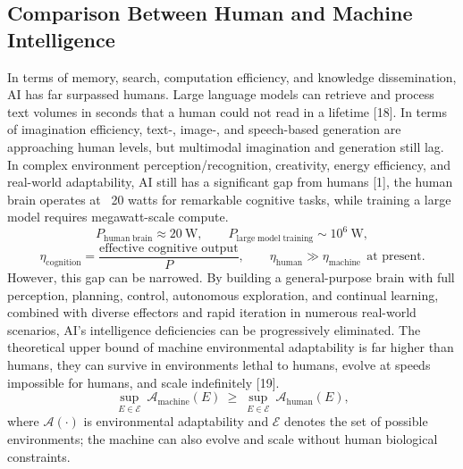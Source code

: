 \documentclass[12pt,a4paper]{article}
\begin{document}
\subsection{Comparison Between Human and Machine Intelligence}
In terms of memory, search, computation efficiency, and knowledge dissemination, AI has far surpassed humans. Large language models can retrieve and process text volumes in seconds that a human could not read in a lifetime [18].
In terms of imagination efficiency, text-, image-, and speech-based generation are approaching human levels, but multimodal imagination and generation still lag.
In complex environment perception/recognition, creativity, energy efficiency, and real-world adaptability, AI still has a significant gap from humans [1], the human brain operates at ~20 watts for remarkable cognitive tasks, while training a large model requires megawatt-scale compute.
\begin{equation}
P_{\mathrm{human\;brain}}\approx20\ \mathrm{W},\qquad
P_{\mathrm{large\;model\;training}}\sim10^{6}\ \mathrm{W},
\label{eq:energy-comparison}
\end{equation}
\begin{equation}
\eta_{\mathrm{cognition}}=\frac{\text{effective cognitive output}}{P},
\qquad
\eta_{\mathrm{human}}\gg\eta_{\mathrm{machine}}\ \ \text{at present}.
\label{eq:cognitive-efficiency}
\end{equation}
However, this gap can be narrowed. By building a general-purpose brain with full perception, planning, control, autonomous exploration, and continual learning, combined with diverse effectors and rapid iteration in numerous real-world scenarios, AI's intelligence deficiencies can be progressively eliminated. The theoretical upper bound of machine environmental adaptability is far higher than humans, they can survive in environments lethal to humans, evolve at speeds impossible for humans, and scale indefinitely [19].
\begin{equation}
\sup_{E\in\mathcal{E}}\ \mathcal{A}_{\mathrm{machine}}(E)\ \geq\ \sup_{E\in\mathcal{E}}\ \mathcal{A}_{\mathrm{human}}(E),
\label{eq:adaptability-bound}
\end{equation}
where $\mathcal{A}(\cdot)$ is environmental adaptability and $\mathcal{E}$ denotes the set of possible environments; the machine can also evolve and scale without human biological constraints.
\end{document}
